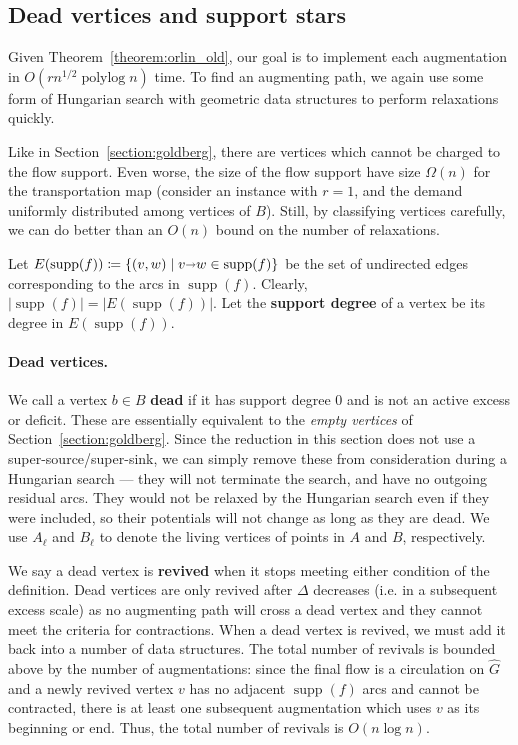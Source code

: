 \documentclass[11pt]{article}
\def\polylog{\mathop{\mathrm{polylog}}}
\def\abs#1{\mathopen| #1 \mathclose|}		%
\def\arcto{\mathord\shortrightarrow}
\def\arc#1#2{#1\arcto#2}
\def\supp{\operatorname{supp}}
\theoremstyle{plain}
\numberwithin{figure}{section}
\def\EMPH#1{\textbf{\boldmath #1}}
\begin{document}
\subsection{Dead vertices and support stars}

Given Theorem~\ref{theorem:orlin_old}, our goal is to implement each
augmentation in $O(rn^{1/2}\polylog n)$ time.
To find an augmenting path, we again use some form of Hungarian search with
geometric data structures to perform relaxations quickly.

Like in Section~\ref{section:goldberg}, there are vertices which cannot be charged
to the flow support.
Even worse, the size of the flow support have size $\Omega(n)$ for the
transportation map (consider an instance with $r=1$, and the demand uniformly
distributed among vertices of $B$).
Still, by classifying vertices carefully, we can do better than an $O(n)$ bound
on the number of relaxations.

Let $E(\supp(f)) \coloneqq \{(v, w) \mid \arc vw \in \supp(f)\}$ be the set
of undirected edges corresponding to the arcs in $\supp(f)$.
Clearly, $\abs{\supp(f)} = \abs{E(\supp(f))}$.
Let the \EMPH{support degree} of a vertex be its degree in $E(\supp(f))$.

\paragraph{Dead vertices.}
We call a vertex $b \in B$ \EMPH{dead} if it has support degree 0 and is not an
active excess or deficit.
These are essentially equivalent to the \emph{empty vertices} of
Section~\ref{section:goldberg}.
Since the reduction in this section does not use a super-source/super-sink,
we can simply remove these from consideration during a Hungarian search ---
they will not terminate the search, and have no outgoing residual arcs.
They would not be relaxed by the Hungarian search even if they were included,
so their potentials will not change as long as they are dead.
We use \EMPH{$A_\ell$} and \EMPH{$B_\ell$} to denote the living
vertices of points in $A$ and $B$, respectively.

We say a dead vertex is \EMPH{revived} when it stops meeting either condition
of the definition.
Dead vertices are only revived after $\Delta$ decreases (i.e. in a
subsequent excess scale) as no augmenting path will cross a dead vertex and
they cannot meet the criteria for contractions.
When a dead vertex is revived, we must add it back into a number of data
structures.
The total number of revivals is bounded above by the number of augmentations:
since the final flow is a circulation on $\hat{G}$ and a newly revived vertex
$v$ has no adjacent $\supp(f)$ arcs and cannot be contracted, there is at least
one subsequent augmentation which uses $v$ as its beginning or end.
Thus, the total number of revivals is $O(n\log n)$.
\end{document}

